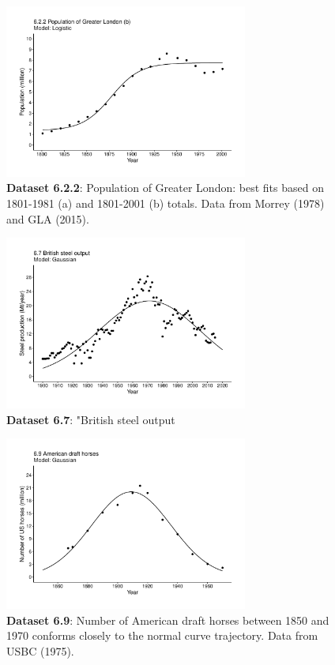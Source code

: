 \documentclass[aps,rmp,preprint,superscriptaddress,10pt,onecolumn]{article}
\begin{document}
\begin{figure}[h]
\includegraphics[width=8cm]{output/figs-ggplot/6.2.2.pdf}
\caption{\textbf{Dataset 6.2.2}: Population of Greater London: best fits based on 1801-1981 (a) and 1801-2001 (b) totals. Data from Morrey (1978) and GLA (2015). }
\end{figure}
	
\begin{figure}[h]
\includegraphics[width=8cm]{output/figs-ggplot/6.7.pdf}
\caption{\textbf{Dataset 6.7}: "British steel output}
\end{figure}
	
\begin{figure}[h]
\includegraphics[width=8cm]{output/figs-ggplot/6.9.pdf}
\caption{\textbf{Dataset 6.9}: Number of American draft horses between 1850 and 1970 conforms closely to the normal curve trajectory. Data from USBC (1975). }
\end{figure}
	
\end{document}

